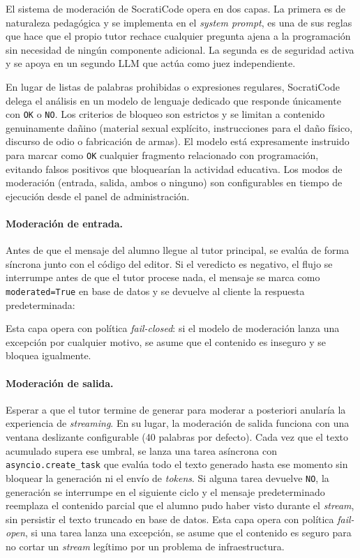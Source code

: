 El sistema de moderación de SocratiCode opera en dos capas. La primera es de naturaleza pedagógica y se implementa en el \textit{system prompt}, es una de sus reglas que hace que el propio tutor rechace cualquier pregunta ajena a la programación sin necesidad de ningún componente adicional. La segunda es de seguridad activa y se apoya en un segundo LLM que actúa como juez independiente.

En lugar de listas de palabras prohibidas o expresiones regulares, SocratiCode delega el análisis en un modelo de lenguaje dedicado que responde únicamente con \texttt{OK} o \texttt{NO}. Los criterios de bloqueo son estrictos y se limitan a contenido genuinamente dañino (material sexual explícito, instrucciones para el daño físico, discurso de odio o fabricación de armas). El modelo está expresamente instruido para marcar como \texttt{OK} cualquier fragmento relacionado con programación, evitando falsos positivos que bloquearían la actividad educativa. Los modos de moderación (entrada, salida, ambos o ninguno) son configurables en tiempo de ejecución desde el panel de administración.

\paragraph{Moderación de entrada.}

Antes de que el mensaje del alumno llegue al tutor principal, se evalúa de forma síncrona junto con el código del editor. Si el veredicto es negativo, el flujo se interrumpe antes de que el tutor procese nada, el mensaje se marca como \texttt{moderated=True} en base de datos y se devuelve al cliente la respuesta predeterminada:


Esta capa opera con política \textit{fail-closed}: si el modelo de moderación lanza una excepción por cualquier motivo, se asume que el contenido es inseguro y se bloquea igualmente.

\paragraph{Moderación de salida.}

Esperar a que el tutor termine de generar para moderar a posteriori anularía la experiencia de \textit{streaming}. En su lugar, la moderación de salida funciona con una ventana deslizante configurable (40 palabras por defecto). Cada vez que el texto acumulado supera ese umbral, se lanza una tarea asíncrona con \texttt{asyncio.create\_task} que evalúa todo el texto generado hasta ese momento sin bloquear la generación ni el envío de \textit{tokens}. Si alguna tarea devuelve \texttt{NO}, la generación se interrumpe en el siguiente ciclo y el mensaje predeterminado reemplaza el contenido parcial que el alumno pudo haber visto durante el \textit{stream}, sin persistir el texto truncado en base de datos. Esta capa opera con política \textit{fail-open}, si una tarea lanza una excepción, se asume que el contenido es seguro para no cortar un \textit{stream} legítimo por un problema de infraestructura.
